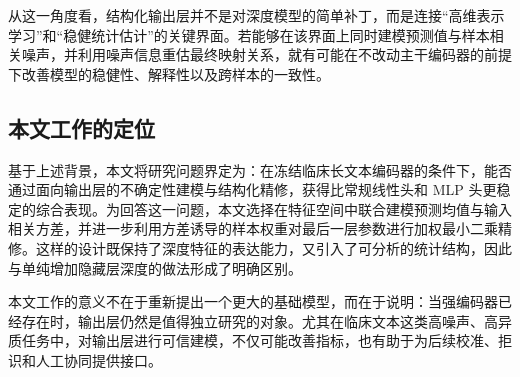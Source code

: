 从这一角度看，结构化输出层并不是对深度模型的简单补丁，而是连接“高维表示学习”和“稳健统计估计”的关键界面。若能够在该界面上同时建模预测值与样本相关噪声，并利用噪声信息重估最终映射关系，就有可能在不改动主干编码器的前提下改善模型的稳健性、解释性以及跨样本的一致性。

\subsection{本文工作的定位}
基于上述背景，本文将研究问题界定为：在冻结临床长文本编码器的条件下，能否通过面向输出层的不确定性建模与结构化精修，获得比常规线性头和 MLP 头更稳定的综合表现。为回答这一问题，本文选择在特征空间中联合建模预测均值与输入相关方差，并进一步利用方差诱导的样本权重对最后一层参数进行加权最小二乘精修。这样的设计既保持了深度特征的表达能力，又引入了可分析的统计结构，因此与单纯增加隐藏层深度的做法形成了明确区别。

本文工作的意义不在于重新提出一个更大的基础模型，而在于说明：当强编码器已经存在时，输出层仍然是值得独立研究的对象。尤其在临床文本这类高噪声、高异质任务中，对输出层进行可信建模，不仅可能改善指标，也有助于为后续校准、拒识和人工协同提供接口。
